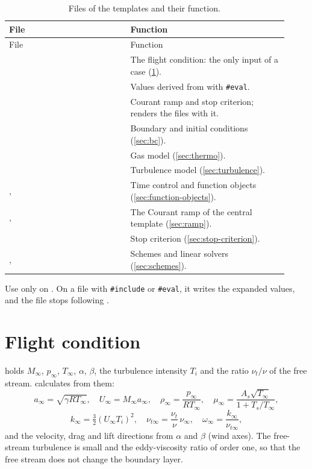 \begin{longtable}{@{}P{0.40\linewidth} P{0.52\linewidth}@{}}
\caption{Files of the templates and their function.}\label{tab:template-files}\\
\toprule
File & Function \\
\midrule
\endfirsthead
\toprule
File & Function \\
\midrule
\endhead
{} & The flight condition: the only input of a case (\cref{sec:flow-conditions}). \\
 & Values derived from  with \texttt{\#eval}. \\
 & Courant ramp and stop criterion;  renders the  files with it. \\
 & Boundary and initial conditions (\cref{sec:bc}). \\
 & Gas model (\cref{sec:thermo}). \\
 & Turbulence model (\cref{sec:turbulence}). \\
,  & Time control and function objects (\cref{sec:function-objects}). \\
,  & The Courant ramp of the central template (\cref{sec:ramp}). \\
 & Stop criterion (\cref{sec:stop-criterion}). \\
,  & Schemes and linear solvers (\cref{sec:schemes}). \\
\bottomrule
\end{longtable}

\begin{caution}
Use  only on . On a file with
\texttt{\#include} or \texttt{\#eval}, it writes the expanded values, and the file stops
following .
\end{caution}

\section{Flight condition}\label{sec:flow-conditions}

 holds $M_\infty$, $p_\infty$, $T_\infty$, $\alpha$, $\beta$, the
turbulence intensity $T_i$ and the ratio $\nu_t/\nu$ of the free stream.
 calculates from them:
\[
  a_\infty = \sqrt{\gamma R T_\infty},\quad
  U_\infty = M_\infty a_\infty,\quad
  \rho_\infty = \frac{p_\infty}{R T_\infty},\quad
  \mu_\infty = \frac{A_s\sqrt{T_\infty}}{1 + T_s/T_\infty},
\]
\[
  k_\infty = \tfrac32 (U_\infty T_i)^2,\quad
  \nu_{t\infty} = \frac{\nu_t}{\nu}\,\nu_\infty,\quad
  \omega_\infty = \frac{k_\infty}{\nu_{t\infty}},
\]
and the velocity, drag and lift directions from $\alpha$ and $\beta$ (wind axes). The
free-stream turbulence is small and the eddy-viscosity ratio of order one, so that the
free stream does not change the boundary layer.

